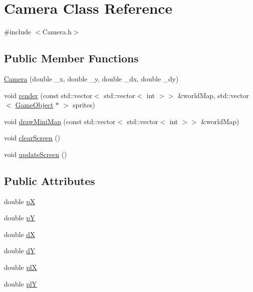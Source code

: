 \hypertarget{classCamera}{\section{Camera Class Reference}
\label{classCamera}
}


{\ttfamily \#include $<$Camera.\-h$>$}

\subsection*{Public Member Functions}
\begin{DoxyCompactItemize}
\item 
\hyperlink{classCamera_ac907efd0aa3a7ff3d923299d3e8898fb}{Camera} (double \-\_\-x, double \-\_\-y, double \-\_\-dx, double \-\_\-dy)
\item 
void \hyperlink{classCamera_a1caf4aca0168afce3b3a59fd95988402}{render} (const std\-::vector$<$ std\-::vector$<$ int $>$$>$ \&world\-Map, std\-::vector$<$ \hyperlink{classGameObject}{Game\-Object} $\ast$ $>$ sprites)
\item 
void \hyperlink{classCamera_ad6694e787b4726baa6d02514e1942b31}{draw\-Mini\-Map} (const std\-::vector$<$ std\-::vector$<$ int $>$$>$ \&world\-Map)
\item 
void \hyperlink{classCamera_a815fc02ea2954af7ee50a54515a1a7a6}{clear\-Screen} ()
\item 
void \hyperlink{classCamera_abc9e8ccef4d50a39e82d7f8308416ee8}{update\-Screen} ()
\end{DoxyCompactItemize}
\subsection*{Public Attributes}
\begin{DoxyCompactItemize}
\item 
double \hyperlink{classCamera_abe152acfd445ee3ab8ab54bc4053a4b3}{p\-X}
\item 
double \hyperlink{classCamera_ab6307d4358b77bf4200c6eb6643fed75}{p\-Y}
\item 
double \hyperlink{classCamera_a3d9d9b2077ddfcd90eb887f0fa472986}{d\-X}
\item 
double \hyperlink{classCamera_a21a394585a8f656fbe39c06575afa62e}{d\-Y}
\item 
double \hyperlink{classCamera_a724db0b967f04e90c0c17c8fd9301d43}{pl\-X}
\item 
double \hyperlink{classCamera_a34e29ef2ecb4a278a91aec6db4e9f412}{pl\-Y}
\end{DoxyCompactItemize}


